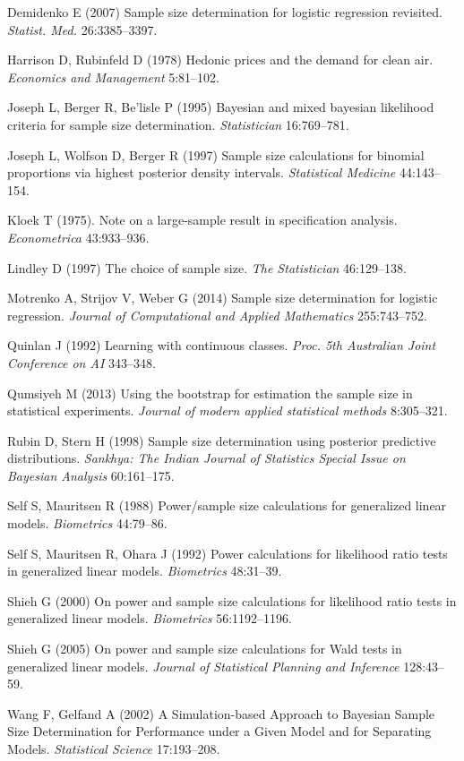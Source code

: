 \documentclass[
11pt,%
tightenlines,%
twoside,%
onecolumn,%
nofloats,%
nobibnotes,%
nofootinbib,%
superscriptaddress,%
noshowpacs,%
centertags]%
{revtex4}
\begin{document}
\begin{thebibliography}{}
	Demidenko E (2007) Sample size determination for logistic regression revisited. \textit{Statist. Med.} 26:3385--3397.
	
	Harrison D, Rubinfeld D (1978) Hedonic prices and the demand for clean air. \textit{Economics and Management} 5:81--102.
	
	Joseph L, Berger R, Be'lisle P (1995) Bayesian and mixed bayesian likelihood criteria for sample size determination. \textit{Statistician} 16:769--781.
	
	Joseph L, Wolfson D, Berger R (1997) Sample size calculations for binomial proportions via highest posterior density intervals. \textit{Statistical Medicine} 44:143--154.
	
	Kloek T (1975). Note on a large-sample result in specification analysis. \textit{Econometrica} 43:933--936.
	
	Lindley D (1997) The choice of sample size. \textit{The Statistician} 46:129--138.
	
	Motrenko A, Strijov V, Weber G (2014) Sample size determination for logistic regression. \textit{Journal of Computational and Applied Mathematics} 255:743--752.
	
	Quinlan J (1992) Learning with continuous classes. \textit{Proc. 5th Australian Joint Conference on AI} 343--348.
	
	Qumsiyeh M (2013) Using the bootstrap for estimation the sample size in statistical experiments. \textit{Journal of modern applied statistical methods} 8:305--321.
	
	Rubin D, Stern H (1998) Sample size determination using posterior predictive distributions. \textit{Sankhya: The Indian Journal of Statistics Special Issue on Bayesian Analysis} 60:161--175.
	
	Self S, Mauritsen R (1988) Power/sample size calculations for generalized linear models. \textit{Biometrics} 44:79--86.
	
	Self S, Mauritsen R, Ohara J (1992) Power calculations for likelihood ratio tests in generalized linear models. \textit{Biometrics} 48:31--39.
	
	Shieh G (2000) On power and sample size calculations for likelihood ratio tests in generalized linear models. \textit{Biometrics} 56:1192--1196.
	
	Shieh G (2005) On power and sample size calculations for Wald tests in generalized linear models. \textit{Journal of Statistical Planning and Inference} 128:43--59.

	Wang F, Gelfand A (2002) A Simulation-based Approach to Bayesian Sample Size Determination for Performance under a Given Model and for Separating Models. \textit{Statistical Science} 17:193--208.

\end{thebibliography}
\end{document}
